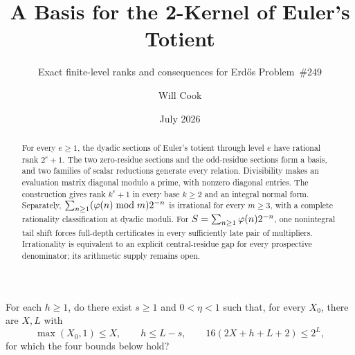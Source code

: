 \documentclass[11pt]{article}
\title{A Basis for the 2-Kernel of Euler's Totient}
\subtitle{Exact finite-level ranks and consequences for Erd\H{o}s
Problem~\#249}
\author{Will Cook}
\date{July 2026}
\begin{document}
\maketitle
\noteprovenance

\begin{problem}
\label{prob:firstharmonic}
For each $h\ge1$, do there exist $s\ge1$ and $0<\eta<1$ such that, for every
$X_0$, there are $X,L$ with
\[
 \max(X_0,1)\le X,\qquad h\le L-s,\qquad
 16(2X+h+L+2)\le2^L,
\]
for which the four bounds below hold?
\end{problem}

\begin{abstract}
For every $e\ge1$, the dyadic sections of Euler's totient through level $e$
have rational rank $2^e+1$. The two zero-residue sections and the odd-residue
sections form a basis, and two families of scalar reductions generate every relation.
Divisibility makes an evaluation matrix diagonal modulo a prime, with nonzero
diagonal entries. The construction gives rank $k^e+1$ in every base $k\ge2$
and an integral normal form.
Separately, $\sum_{n\ge1}(\varphi(n)\bmod m)2^{-n}$ is irrational for every
$m\ge3$, with a complete rationality classification at dyadic moduli.
For $S=\sum_{n\ge1}\varphi(n)2^{-n}$, one nonintegral tail shift forces
full-depth certificates in every sufficiently late pair of multipliers.
Irrationality is equivalent to an explicit central-residue gap for every
prospective denominator; its arithmetic supply remains open.
\end{abstract}
\end{document}
